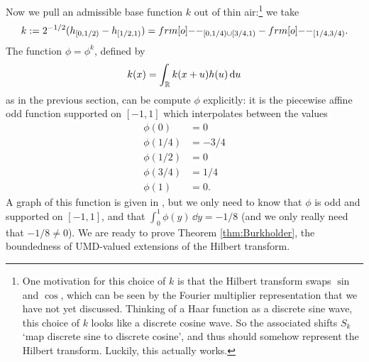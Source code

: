 Now we pull an admissible base function $k$ out of thin air:\footnote{One motivation for this choice of $k$ is that the Hilbert transform swaps $\sin$ and $\cos$, which can be seen by the Fourier multiplier representation that we have not yet discussed. Thinking of a Haar function as a discrete sine wave, this choice of $k$ looks like a discrete cosine wave. So the associated shifts $S_{k}$ `map discrete sine to discrete cosine', and thus should somehow represent the Hilbert transform. Luckily, this actually works.} we take
\begin{equation*}
  k := 2^{-1/2}(h_{[0,1/2)} - h_{[1/2,1)}) = \1_{[0,1/4) \cup [3/4,1)} -\1_{[1/4, 3/4)}.
\end{equation*}
The function $\phi = \phi^{k}$, defined by
\begin{equation*}
  k(x) = \int_{\mathbb{R}} k(x+u)h(u) \, \mathrm{d} u
\end{equation*}
as in the previous section, can be compute $\phi$ explicitly: it is the piecewise affine odd function supported on $[-1,1]$ which interpolates between the values
\begin{equation*}
  \begin{aligned}
    \phi(0) &= 0 \\
    \phi(1/4) &= -3/4 \\
    \phi(1/2) &= 0 \\
    \phi(3/4) &= 1/4 \\
    \phi(1) &= 0.
  \end{aligned}
\end{equation*}
A graph of this function is given in \cite[Figure 5.1]{HNVW16}, but we only need to know that $\phi$ is odd and supported on $[-1,1]$, and that $\int_{0}^{1} \phi(y) \, \dd y = -1/8$ (and we only really need that $-1/8 \neq 0$).
We are ready to prove Theorem \ref{thm:Burkholder}, the boundedness of UMD-valued extensions of the Hilbert transform.

